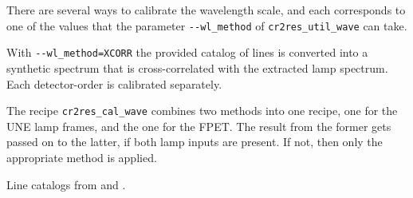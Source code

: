 There are several ways to calibrate the wavelength scale, and each corresponds
to one of the values that the parameter \texttt{-{}-wl\_method} of
\texttt{cr2res\_util\_wave} can take.

With \texttt{-{}-wl\_method=XCORR} the provided catalog of lines is converted
into a synthetic spectrum that is cross-correlated with the extracted lamp
spectrum. Each detector-order is calibrated separately.

The recipe \texttt{cr2res\_cal\_wave} combines two methods into one recipe, one
for the UNE lamp frames, and the one for the FPET. The result from the former
gets passed on to the latter, if both lamp inputs are present. If not, then only
the appropriate method is applied.

Line catalogs from \cite{2018A&A...618A.118S} and \cite{2011ApJS..195...24R}.